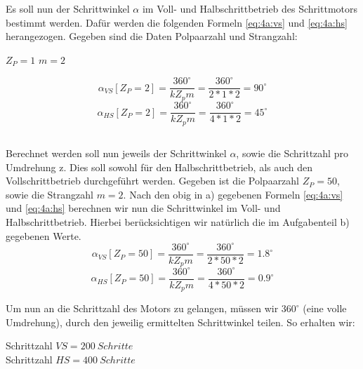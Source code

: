 \chapter{}\label{ch:aufg4}

\section{}\label{sec:4a}
Es soll nun der Schrittwinkel $ \alpha $ im Voll- und Halbschrittbetrieb des Schrittmotors bestimmt werden. Dafür werden die folgenden Formeln \ref{eq:4a:vs} und \ref{eq:4a:hs} herangezogen. Gegeben sind die Daten Polpaarzahl und Strangzahl: 
\begin{center}
	$ Z_{P} = 1 $ \hspace{2cm} $ m = 2 $ 
\end{center}

\begin{equation}
	\alpha_{VS}[Z_{P}=2] = \frac{360^{\circ}}{kZ_{p}m} = \frac{360^{\circ}}{2*1*2} = 90^{\circ}
	\label{eq:4a:vs}
\end{equation}
\begin{equation}
	\alpha_{HS}[Z_{P}=2] = \frac{360^{\circ}}{kZ_{p}m} = \frac{360^{\circ}}{4*1*2} = 45^{\circ}
	\label{eq:4a:hs}
\end{equation}

\section{}\label{sec:4b}
Berechnet werden soll nun jeweils der Schrittwinkel $ \alpha $, sowie die Schrittzahl pro Umdrehung z. Dies soll sowohl für den Halbschrittbetrieb, als auch den Vollschrittbetrieb durchgeführt werden. Gegeben ist die Polpaarzahl $ Z_{P} = 50 $, sowie die Strangzahl $ m = 2 $.
Nach den obig in a) gegebenen Formeln \ref{eq:4a:vs} und \ref{eq:4a:hs} berechnen wir nun die Schrittwinkel im Voll- und Halbschrittbetrieb. Hierbei berücksichtigen wir natürlich die im Aufgabenteil b) gegebenen Werte.
\begin{equation}
\alpha_{VS}[Z_{P}=50] = \frac{360^{\circ}}{kZ_{p}m} = \frac{360^{\circ}}{2*50*2} = 1.8^{\circ}
\label{eq:4b:vs}
\end{equation}
\begin{equation}
	\alpha_{HS}[Z_{P}=50] = \frac{360^{\circ}}{kZ_{p}m} = \frac{360^{\circ}}{4*50*2} = 0.9^{\circ}
	\label{eq:4b:hs}
\end{equation}

Um nun an die Schrittzahl des Motors zu gelangen, müssen wir $ 360^{\circ} $ (eine volle Umdrehung), durch den jeweilig ermittelten Schrittwinkel teilen. So erhalten wir:
\begin{center}
	Schrittzahl $ VS = 200~Schritte $\\
	Schrittzahl $ HS = 400~Schritte$
\end{center}

